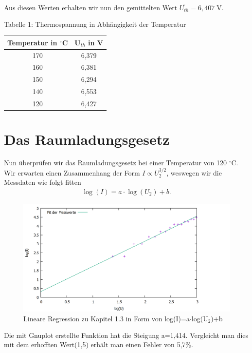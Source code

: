 Aus diesen Werten erhalten wir nun den gemittelten Wert $ \overline{U_{th}} =6,407\; $V.
\begin{center}
	Tabelle 1: Thermospannung in Abhängigkeit der Temperatur
\end{center}
\begin{center}
	\begin{tabular}{|c|c|}
		\hline
		Temperatur in $^\circ$C & U$_{th}$ in V \\ \hline
		170           &     6,379     \\ \hline
		160           &     6,381     \\ \hline
		150           &     6,294     \\ \hline
		140           &     6,553     \\ \hline
		120           &     6,427     \\ \hline
	\end{tabular} 
\end{center}
\newpage
\section{Das Raumladungsgesetz}
Nun überprüfen wir das Raumladungsgesetz bei einer Temperatur von 120 $ ^\circ $C. Wir erwarten einen Zusammenhang der Form $I\propto U_{2}^{3/2}  $, weswegen wir die Messdaten wie folgt fitten
\begin{align*}
\log(I)=a\cdot \log(U_{2})+b\text{.}
\end{align*}
\begin{figure}
	\includegraphics[width=\textwidth]{../Daten/Aufgabe1/Aufgabe1_3.png}
	\caption{Lineare Regression zu Kapitel 1.3 in Form von log(I)=a$ \cdot $log(U$ _2 $)+b}
\end{figure}
Die mit Gnuplot erstellte Funktion hat die Steigung a=1,414. Vergleicht man dies mit dem erhofften Wert(1,5) erhält man einen Fehler von 5,7\%.

